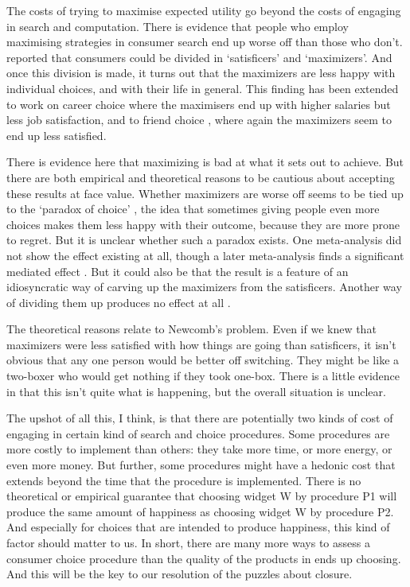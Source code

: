 \documentclass[
  11pt,
]{book}
\begin{document}
The costs of trying to maximise expected utility go beyond the costs of engaging in search and computation. There is evidence that people who employ maximising strategies in consumer search end up worse off than those who don't. \citet{SchwartzEtAl2002} reported that consumers could be divided in `satisficers' and `maximizers'. And once this division is made, it turns out that the maximizers are less happy with individual choices, and with their life in general. This finding has been extended to work on career choice \citep{IyengarEtAl2006} where the maximisers end up with higher salaries but less job satisfaction, and to friend choice \citep{NewmanEtAl2018}, where again the maximizers seem to end up less satisfied.

There is evidence here that maximizing is bad at what it sets out to achieve. But there are both empirical and theoretical reasons to be cautious about accepting these results at face value. Whether maximizers are worse off seems to be tied up to the `paradox of choice' \citep{Schwartz2004}, the idea that sometimes giving people even more choices makes them less happy with their outcome, because they are more prone to regret. But it is unclear whether such a paradox exists. One meta-analysis \citep{ScheibehenneEtAl2010} did not show the effect existing at all, though a later meta-analysis finds a significant mediated effect \citep{ChernevEtAl2015}. But it could also be that the result is a feature of an idiosyncratic way of carving up the maximizers from the satisficers. Another way of dividing them up produces no effect at all \citep{DiabEtAl2008}.

The theoretical reasons relate to Newcomb's problem. Even if we knew that maximizers were less satisfied with how things are going than satisficers, it isn't obvious that any one person would be better off switching. They might be like a two-boxer who would get nothing if they took one-box. There is a little evidence in \citet{IyengarEtAl2006} that this isn't quite what is happening, but the overall situation is unclear.

The upshot of all this, I think, is that there are potentially two kinds of cost of engaging in certain kind of search and choice procedures. Some procedures are more costly to implement than others: they take more time, or more energy, or even more money. But further, some procedures might have a hedonic cost that extends beyond the time that the procedure is implemented. There is no theoretical or empirical guarantee that choosing widget W by procedure P1 will produce the same amount of happiness as choosing widget W by procedure P2. And especially for choices that are intended to produce happiness, this kind of factor should matter to us. In short, there are many more ways to assess a consumer choice procedure than the quality of the products in ends up choosing. And this will be the key to our resolution of the puzzles about closure.
\end{document}

